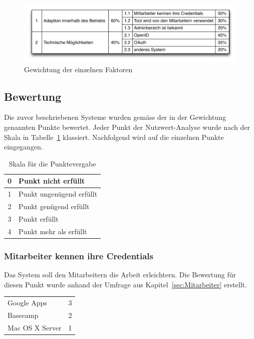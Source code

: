\begin{figure}[H]
    \centering 
		\includegraphics[width=1\textwidth]{include/nutzwertanalyse1.pdf}
		\caption{Gewichtung der einzelnen Faktoren}
		\label{fig:nutzwertanalyse gewichtung}
\end{figure}

\subsection{Bewertung}
\label{sub:Bewertung}
Die zuvor beschriebenen Systeme wurden gemäss der in der Gewichtung genannten Punkte bewertet. Jeder Punkt der Nutzwert-Analyse wurde nach der Skala in Tabelle~\ref{tab:nutzwertanalyse skala} klassiert. Nachfolgend wird auf die einzelnen Punkte eingegangen.

\begin{table}[h]
    \centering
        \begin{tabular}{|c|l|}
        \hline
        0 & Punkt nicht erfüllt\\
        \hline
        1 & Punkt ungenügend erfüllt\\
        \hline
        2 & Punkt genügend erfüllt\\
        \hline
        3 & Punkt erfüllt\\
        \hline
        4 & Punkt mehr als erfüllt\\
        \hline
        \end{tabular}
		\caption{Skala für die Punktevergabe}
		\label{tab:nutzwertanalyse skala}
\end{table}


\subsubsection{Mitarbeiter kennen ihre Credentials}
\label{ssub:Mitarbeiter kennen ihre Credentials}
Das System soll den Mitarbeitern die Arbeit erleichtern. Die Bewertung für diesen Punkt wurde anhand der Umfrage aus Kapitel~\ref{sec:Mitarbeiter} erstellt.

\begin{tabular}{lc}
Google Apps & 3\\
Basecamp & 2\\
Mac OS X Server & 1\\
\end{tabular}

